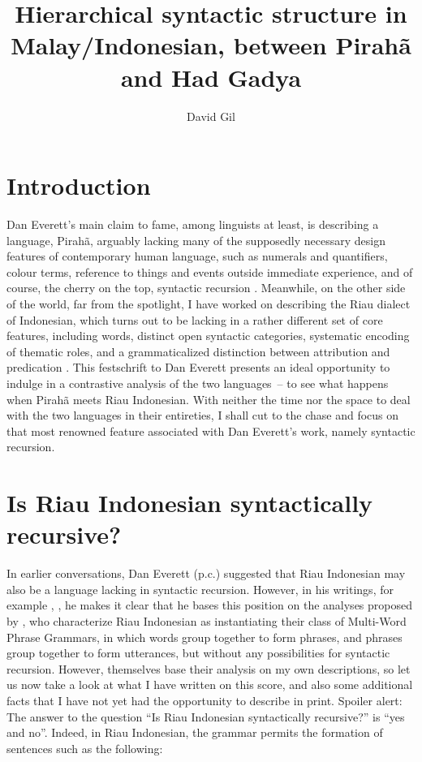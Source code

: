 \documentclass[output=paper]{langscibook}
\author{David Gil\affiliation{Max Planck Institute for Evolutionary Anthropology}}
\title[Hierarchical syntactic structure in Malay/Indonesian]{Hierarchical syntactic structure in Malay/Indonesian, between Pirahã and Had Gadya}
\begin{document}
\maketitle

\section{Introduction}
\begin{sloppypar}
Dan Everett's main claim to fame, among linguists at least, is describing a language, Pirahã, arguably lacking many of the supposedly necessary design features of contemporary human language, such as numerals and quantifiers, colour terms, reference to things and events outside immediate experience, and of course, the cherry on the top, syntactic recursion \citep{everett2005cultural}. Meanwhile, on the other side of the world, far from the spotlight, I have worked on describing the Riau dialect of Indonesian, which turns out to be lacking in a rather different set of core features, including words, distinct open syntactic categories, systematic encoding of thematic roles, and a grammaticalized distinction between attribution and predication \citep{gil2005word,gil2006intonation,gil2012predication,gil2013riau, gil2017isolating, gil2020isolating}. This festschrift to Dan Everett presents an ideal opportunity to indulge in a contrastive analysis of the two languages~– to see what happens when Pirahã meets Riau Indonesian. With neither the time nor the space to deal with the two languages in their entireties, I shall cut to the chase and focus on that most renowned feature associated with Dan Everett's work, namely syntactic recursion.
\end{sloppypar}

\section{Is Riau Indonesian syntactically recursive?}

In earlier conversations, Dan Everett (p.c.) suggested that Riau Indonesian may also be a language lacking in syntactic recursion. However, in his writings, for example \citet{futrell2016corpus}, \citet{everett2017grammar}, he makes it clear that he bases this position on the analyses proposed by \citet{jackendoff2014syntax, jackendoff2017linear}, who characterize Riau Indonesian as instantiating their class of Multi-Word Phrase Grammars, in which words group together to form phrases, and phrases group together to form utterances, but without any possibilities for syntactic recursion. However, \citet{jackendoff2014syntax, jackendoff2017linear} themselves base their analysis on my own descriptions, so let us now take a look at what I have written on this score, and also some additional facts that I have not yet had the opportunity to describe in print. Spoiler alert: The answer to the question ``Is Riau Indonesian syntactically recursive?'' is ``yes and no''.
Indeed, in Riau Indonesian, the grammar permits the formation of sentences such as the following:
\end{document}
